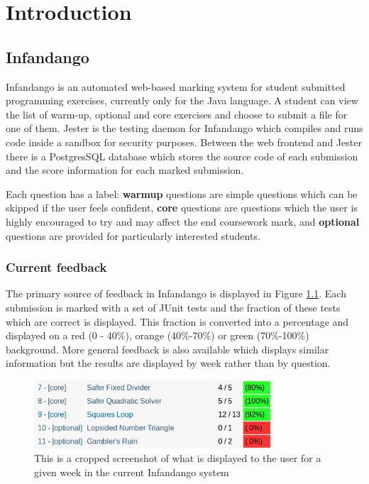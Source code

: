 \chapter{Introduction}
\label{introduction}

\section{Infandango}
Infandango is an automated web-based marking system for student submitted programming exercises, currently only for the Java language. A student can view the list of warm-up, optional and core exercises and choose to submit a file for one of them. Jester is the testing daemon for Infandango which compiles and runs code inside a sandbox for security purposes. Between the web frontend and Jester there is a PostgresSQL database which stores the source code of each submission and the score information for each marked submission.

Each question has a label: {\bf warmup} questions are simple questions which can be skipped if the user feels confident, {\bf core} questions are questions which the user is highly encouraged to try and may affect the end coursework mark, and {\bf optional} questions are provided for particularly interested students.

\subsection{Current feedback}
The primary source of feedback in Infandango is displayed in Figure \ref{fig:currentfeedback}. Each submission is marked with a set of JUnit tests and the fraction of these tests which are correct is displayed. This fraction is converted into a percentage and displayed on a red (0 - 40\%), orange (40\%-70\%) or green (70\%-100\%) background.
More general feedback is also available which displays similar information but the results are displayed by week rather than by question. 

\begin{figure}[h!]
\centering
\includegraphics[width=0.8\textwidth]{images/currentfeedback.png}
\caption{This is a cropped screenshot of what is displayed to the user for a given week in the current Infandango system}
\label{fig:currentfeedback}
\end{figure}

